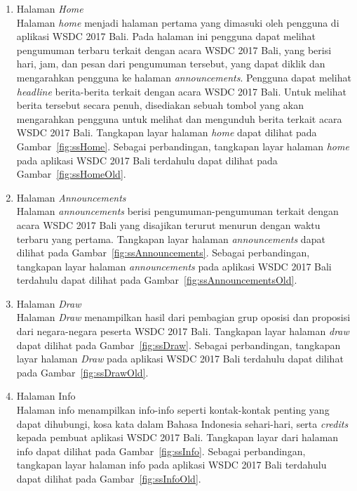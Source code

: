 \begin{enumerate}
	\item Halaman \textit{Home} \\
		Halaman \textit{home} menjadi halaman pertama yang dimasuki oleh pengguna di aplikasi WSDC 2017 Bali. Pada halaman ini pengguna dapat melihat pengumuman terbaru terkait dengan acara WSDC 2017 Bali, yang berisi hari, jam, dan pesan dari pengumuman tersebut, yang dapat diklik dan mengarahkan pengguna ke halaman \textit{announcements}. Pengguna dapat melihat \textit{headline} berita-berita terkait dengan acara WSDC 2017 Bali. Untuk melihat berita tersebut secara penuh, disediakan sebuah tombol yang akan mengarahkan pengguna untuk melihat dan mengunduh berita terkait acara WSDC 2017 Bali. Tangkapan layar halaman \textit{home} dapat dilihat pada Gambar~\ref{fig:ssHome}. Sebagai perbandingan, tangkapan layar halaman \textit{home} pada aplikasi WSDC 2017 Bali terdahulu dapat dilihat pada Gambar~\ref{fig:ssHomeOld}.
		
	\item Halaman \textit{Announcements} \\
		Halaman \textit{announcements} berisi pengumuman-pengumuman terkait dengan acara WSDC 2017 Bali yang disajikan terurut menurun dengan waktu terbaru yang pertama. Tangkapan layar halaman \textit{announcements} dapat dilihat pada Gambar~\ref{fig:ssAnnouncements}. Sebagai perbandingan, tangkapan layar halaman \textit{announcements} pada aplikasi WSDC 2017 Bali terdahulu dapat dilihat pada Gambar~\ref{fig:ssAnnouncementsOld}.
	
	\item Halaman \textit{Draw} \\
		Halaman \textit{Draw} menampilkan hasil dari pembagian grup oposisi dan proposisi dari negara-negara peserta WSDC 2017 Bali. Tangkapan layar halaman \textit{draw} dapat dilihat pada Gambar~\ref{fig:ssDraw}. Sebagai perbandingan, tangkapan layar halaman \textit{Draw} pada aplikasi WSDC 2017 Bali terdahulu dapat dilihat pada Gambar~\ref{fig:ssDrawOld}.
		
	\item Halaman Info \\
		Halaman info menampilkan info-info seperti kontak-kontak penting yang dapat dihubungi, kosa kata dalam Bahasa Indonesia sehari-hari, serta {\it credits} kepada pembuat aplikasi WSDC 2017 Bali. Tangkapan layar dari halaman info dapat dilihat pada Gambar~\ref{fig:ssInfo}. Sebagai perbandingan, tangkapan layar halaman info pada aplikasi WSDC 2017 Bali terdahulu dapat dilihat pada Gambar~\ref{fig:ssInfoOld}.
		

\end{enumerate}
